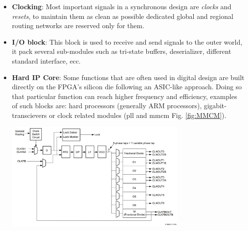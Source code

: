 \documentclass[../../main.tex]{subfiles}
\begin{document}
\begin{itemize}
\begin{minipage}{\linewidth}
    \end{minipage}
    \item \textbf{Clocking}: Most important signals in a synchronous design are \textit{clocks} and \textit{resets}, to maintain them as clean as possible dedicated global and regional routing networks are reserved only for them.  
    \item \textbf{I/O block}: This block is used to receive and send signals to the outer world, it pack several sub-modules such as tri-state buffers, deserializer, different standard interface, ecc.
    \item \textbf{Hard IP Core}: Some functions that are often used in digital design are built directly on the FPGA's silicon die following an ASIC-like approach. Doing so that particular function can reach higher frequency and efficiency, examples of such blocks are: hard processors (generally ARM processors), gigabit-transcievers or clock related modules (\acrshort{pll} and \acrshort{mmcm} Fig. \ref{fig:MMCM}).
    \begin{minipage}{\linewidth}
        \centering
        \includegraphics[width=9cm]{sections/04/Images/PLL.jpg}
        \label{fig:MMCM}
    \end{minipage}
\end{itemize}
        
\end{document}
